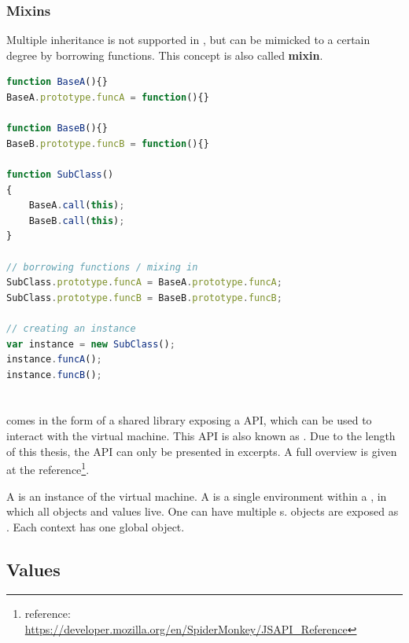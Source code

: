 \newpage
\subsubsection{Mixins}
\label{sec:Mixins}

Multiple inheritance is not supported in , but can be mimicked to a certain degree by borrowing functions. This concept is also called \textbf{mixin}.

\SingleSpacing
\begin{lstlisting}[language=JavaScript, caption=Mixins in \myProperName{JavaScript}, label=JSMixins]
function BaseA(){}
BaseA.prototype.funcA = function(){}

function BaseB(){}
BaseB.prototype.funcB = function(){}

function SubClass()
{
	BaseA.call(this);
	BaseB.call(this);
}

// borrowing functions / mixing in
SubClass.prototype.funcA = BaseA.prototype.funcA;
SubClass.prototype.funcB = BaseB.prototype.funcB;

// creating an instance
var instance = new SubClass();
instance.funcA();
instance.funcB();
\end{lstlisting}
\OnehalfSpacing

\section{}

 comes in the form of a shared library exposing a  API, which can be used to interact with the  virtual machine. This API is also known as . Due to the length of this thesis, the API can only be presented in excerpts. A full overview is given at the  reference\footnote{ reference: \url{https://developer.mozilla.org/en/SpiderMonkey/JSAPI_Reference}}.

A  is an instance of the virtual machine. A  is a single environment within a , in which all objects and values live. One  can have multiple s.  objects are exposed as . Each context has one global object.

\subsection{Values}

